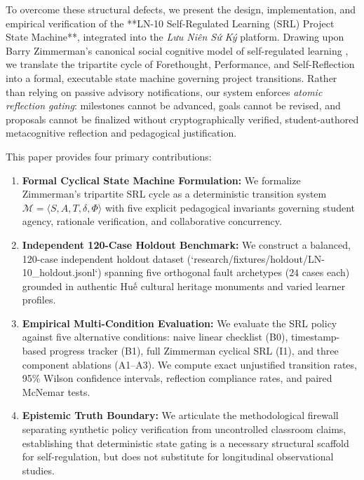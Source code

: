 \documentclass[11pt,a4paper]{article}
\begin{document}
To overcome these structural defects, we present the design, implementation, and empirical verification of the **LN-10 Self-Regulated Learning (SRL) Project State Machine**, integrated into the \textit{Lưu Niên Sứ Ký} platform. Drawing upon Barry Zimmerman's canonical social cognitive model of self-regulated learning \cite{zimmerman2000attaining, zimmerman2002becoming}, we translate the tripartite cycle of Forethought, Performance, and Self-Reflection into a formal, executable state machine governing project transitions. Rather than relying on passive advisory notifications, our system enforces \textit{atomic reflection gating}: milestones cannot be advanced, goals cannot be revised, and proposals cannot be finalized without cryptographically verified, student-authored metacognitive reflection and pedagogical justification.

This paper provides four primary contributions:
\begin{enumerate}
    \item \textbf{Formal Cyclical State Machine Formulation:} We formalize Zimmerman's tripartite SRL cycle as a deterministic transition system $\mathcal{M} = \langle S, A, T, \delta, \Phi \rangle$ with five explicit pedagogical invariants governing student agency, rationale verification, and collaborative concurrency.
    \item \textbf{Independent 120-Case Holdout Benchmark:} We construct a balanced, 120-case independent holdout dataset (`research/fixtures/holdout/LN-10_holdout.jsonl`) spanning five orthogonal fault archetypes ($24$ cases each) grounded in authentic Huế cultural heritage monuments and varied learner profiles.
    \item \textbf{Empirical Multi-Condition Evaluation:} We evaluate the SRL policy against five alternative conditions: naive linear checklist (B0), timestamp-based progress tracker (B1), full Zimmerman cyclical SRL (I1), and three component ablations (A1--A3). We compute exact unjustified transition rates, 95\% Wilson confidence intervals, reflection compliance rates, and paired McNemar tests.
    \item \textbf{Epistemic Truth Boundary:} We articulate the methodological firewall separating synthetic policy verification from uncontrolled classroom claims, establishing that deterministic state gating is a necessary structural scaffold for self-regulation, but does not substitute for longitudinal observational studies.
\end{enumerate}
\end{document}
